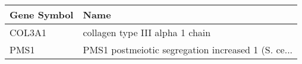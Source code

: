 \begin{tabular}{ll}
\toprule
Gene Symbol &                                               Name \\
\midrule
     COL3A1 &                    collagen type III alpha 1 chain \\
       PMS1 & PMS1 postmeiotic segregation increased 1 (S. ce... \\
\bottomrule
\end{tabular}
